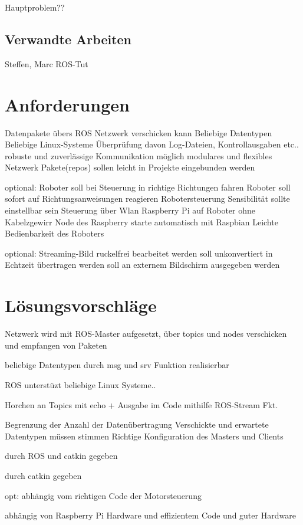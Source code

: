 \documentclass[12pt]{article}
\begin{document}
Hauptproblem??

\subsection{Verwandte Arbeiten}

Steffen, Marc
ROS-Tut

\section{Anforderungen}

Datenpakete übers ROS Netzwerk verschicken kann
Beliebige Datentypen
Beliebige Linux-Systeme
Überprüfung davon Log-Dateien, Kontrollausgaben etc..
robuste und zuverlässige Kommunikation möglich
modulares und flexibles Netzwerk
Pakete(repos) sollen leicht in Projekte eingebunden werden

optional:
Roboter soll bei Steuerung in richtige Richtungen fahren
Roboter soll sofort auf Richtungsanweisungen reagieren
Robotersteuerung Sensibilität sollte einstellbar sein
Steuerung über Wlan
Raspberry Pi auf Roboter ohne Kabelzgewirr
Node des Raspberry starte automatisch mit Raspbian
Leichte Bedienbarkeit des Roboters

optional:
Streaming-Bild ruckelfrei bearbeitet werden
soll unkonvertiert in Echtzeit übertragen werden
soll an externem Bildschirm ausgegeben werden

\section{Lösungsvorschläge}

Netzwerk wird mit ROS-Master aufgesetzt, über topics und nodes
verschicken und empfangen von Paketen 

beliebige Datentypen durch msg und srv Funktion realisierbar

ROS unterstüzt beliebige Linux Systeme..

Horchen an Topics mit echo + Ausgabe im Code mithilfe ROS-Stream Fkt.

Begrenzung der Anzahl der Datenübertragung
Verschickte und erwartete Datentypen müssen stimmen
Richtige Konfiguration des Masters und Clients

durch ROS und catkin gegeben 

durch catkin gegeben

opt:
abhängig vom richtigen Code der Motorsteuerung

abhängig von Raspberry Pi Hardware und effizientem Code und
guter Hardware
\end{document}
